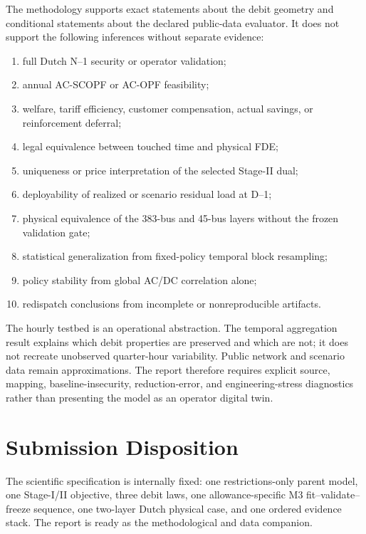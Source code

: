 \documentclass[10pt,journal,onecolumn]{IEEEtran}
\begin{document}
The methodology supports exact statements about the debit geometry and
conditional statements about the declared public-data evaluator. It does not
support the following inferences without separate evidence:
\begin{enumerate}[leftmargin=*,itemsep=3pt]
\item full Dutch N--1 security or operator validation;
\item annual AC-SCOPF or AC-OPF feasibility;
\item welfare, tariff efficiency, customer compensation, actual savings, or
reinforcement deferral;
\item legal equivalence between touched time and physical FDE;
\item uniqueness or price interpretation of the selected Stage-II dual;
\item deployability of realized or scenario residual load at D--1;
\item physical equivalence of the 383-bus and 45-bus layers without the frozen
validation gate;
\item statistical generalization from fixed-policy temporal block resampling;
\item policy stability from global AC/DC correlation alone;
\item redispatch conclusions from incomplete or nonreproducible artifacts.
\end{enumerate}

The hourly testbed is an operational abstraction. The temporal aggregation
result explains which debit properties are preserved and which are not; it
does not recreate unobserved quarter-hour variability. Public network and
scenario data remain approximations. The report therefore requires explicit
source, mapping, baseline-insecurity, reduction-error, and engineering-stress
diagnostics rather than presenting the model as an operator digital twin.

\section{Submission Disposition}
\label{sec:report_disposition}

The scientific specification is internally fixed: one restrictions-only parent
model, one Stage-I/II objective, three debit laws, one allowance-specific M3
fit--validate--freeze sequence, one two-layer Dutch physical case, and one
ordered evidence stack. The report is ready as the methodological and data
companion.
\end{document}
